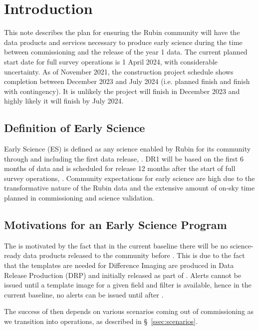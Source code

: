 \section{Introduction}

This  note describes the plan for ensuring the Rubin community will have the data products and services necessary to produce early science during the time between commissioning and the release of the year 1 data.
The current planned start date for full survey operations is 1 April 2024, with considerable uncertainty.
As of November 2021, the construction project schedule shows completion between December 2023 and July 2024 (i.e. planned finish and finish with contingency).
It is unlikely the project will finish in December 2023 and highly likely it will finish by July 2024.

\subsection{Definition of Early Science}  \label{ssec:defn}

Early Science (ES) is defined as any science enabled by Rubin for its community through and including the first data release, \drone.
DR1 will be based on the first 6 months of data and is scheduled for release 12 months  after the start of full survey operations, \citep{RDO-011}.
Community expectations for early science are high due to the transformative nature of the Rubin data and the extensive amount of on-sky time planned in commissioning and science validation.

\subsection{Motivations for an Early Science Program}

The \esp is motivated by the fact that in the current baseline there will be no science-ready data products released to the community before \drone.
This is due to the fact that the templates are needed for Difference Imaging are produced in Data Release Production (DRP) and initially released as part of \drone.
Alerts cannot be issued until a template image for a given field and filter is available, hence  in the current baseline, no alerts can be issued until after \drone.

The success of \es then depends on various scenarios coming out of commissioning as we transition into operations, as described in \S~\ref{ssec:scenarios}.

